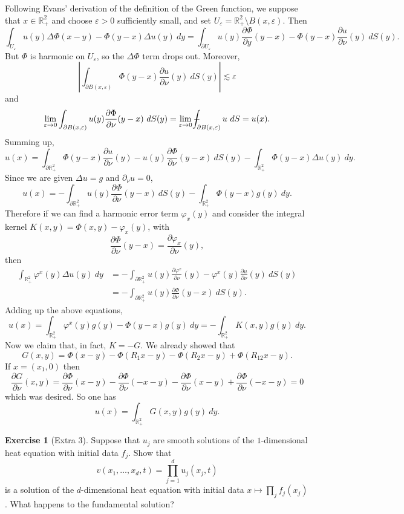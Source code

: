 \documentclass[10pt]{article}
\newcommand{\RR}{\mathbb{R}}
\theoremstyle{definition}
\newtheorem{exer}{Exercise}
\def\Xint#1{\mathchoice
{\XXint\displaystyle\textstyle{#1}}%
{\XXint\textstyle\scriptstyle{#1}}%
{\XXint\scriptstyle\scriptscriptstyle{#1}}%
{\XXint\scriptscriptstyle\scriptscriptstyle{#1}}%
\!\int}
\def\XXint#1#2#3{{\setbox0=\hbox{$#1{#2#3}{\int}$ }
\vcenter{\hbox{$#2#3$ }}\kern-.6\wd0}}
\def\dashint{\Xint-}
\begin{document}
Following Evans' derivation of the definition of the Green function, we suppose that $x \in \RR_+^2$ and choose $\varepsilon > 0$ sufficiently small, and set $U_\varepsilon = \RR^2_+ \setminus B(x, \varepsilon)$. Then
$$\int_{U_\varepsilon} u(y)\Delta \Phi(x - y) - \Phi(y - x)\Delta u(y)~dy = \int_{\partial U_\varepsilon} u(y) \frac{\partial \Phi}{\partial y}(y - x) - \Phi(y - x) \frac{\partial u}{\partial \nu}(y)~dS(y).$$
But $\Phi$ is harmonic on $U_\varepsilon$, so the $\Delta \Phi$ term drops out. Moreover,
$$\left|\int_{\partial B(x, \varepsilon)} \Phi(y - x) \frac{\partial u}{\partial \nu}(y)~dS(y)\right| \lesssim \varepsilon$$
and
$$\lim_{\varepsilon \to 0}\int_{\partial B(x, \varepsilon)} u(y) \frac{\partial \Phi}{\partial \nu}(y - x)~dS(y) = \lim_{\varepsilon \to 0}\dashint_{\partial B(x, \varepsilon)} u~dS = u(x).$$
Summing up,
$$u(x) = \int_{\partial \RR_+^2} \Phi(y - x) \frac{\partial u}{\partial \nu}(y) - u(y) \frac{\partial \Phi}{\partial \nu}(y - x)~dS(y) - \int_{\RR_+^2} \Phi(y - x)\Delta u(y)~dy.$$
Since we are given $\Delta u = g$ and $\partial_\nu u = 0$,
$$u(x) = -\int_{\partial \RR_+^2} u(y) \frac{\partial \Phi}{\partial \nu}(y - x)~dS(y) - \int_{\RR_+^2} \Phi(y-x) g(y)~dy.$$
Therefore if we can find a harmonic error term $\varphi_x(y)$ and consider the integral kernel $K(x, y) = \Phi(x, y) - \varphi_x(y)$, with
$$\frac{\partial \Phi}{\partial \nu}(y-x) = \frac{\partial \varphi_x}{\partial \nu}(y),$$
then
\begin{align*}\int_{\RR_+^2} \varphi^x(y) \Delta u(y)~dy &= -\int_{\partial \RR_+^2} u(y) \frac{\partial \varphi^x}{\partial \nu}(y) - \varphi^x(y) \frac{\partial u}{\partial \nu}(y) ~dS(y)\\
&= -\int_{\partial \RR^2_+} u(y) \frac{\partial \Phi}{\partial \nu}(y-x)~dS(y).
\end{align*}
Adding up the above equations,
$$u(x) = \int_{\RR_+^2} \varphi^x(y) g(y) - \Phi(y - x) g(y)~dy = -\int_{\RR_+^2} K(x, y)g(y)~dy.$$
Now we claim that, in fact, $K = -G$. We already showed that
$$G(x, y) = \Phi(x - y) - \Phi(R_1x - y) - \Phi(R_2x - y) + \Phi(R_{12}x - y).$$
If $x = (x_1, 0)$ then
$$\frac{\partial G}{\partial \nu}(x, y) = \frac{\partial \Phi}{\partial \nu}(x - y) - \frac{\partial \Phi}{\partial \nu}(-x-y) - \frac{\partial \Phi}{\partial \nu}(x - y) + \frac{\partial \Phi}{\partial \nu}(-x-y) = 0$$
which was desired.
So one has
$$u(x) = \int_{\RR^2_+} G(x, y) g(y)~dy.$$

\begin{exer}[Extra 3]
Suppose that $u_j$ are smooth solutions of the $1$-dimensional heat equation with initial data $f_j$. Show that
$$v(x_1, \dots, x_d, t) = \prod_{j=1}^d u_j(x_j, t)$$
is a solution of the $d$-dimensional heat equation with initial data $x \mapsto \prod_j f_j(x_j)$.
What happens to the fundamental solution?
\end{exer}
\end{document}
